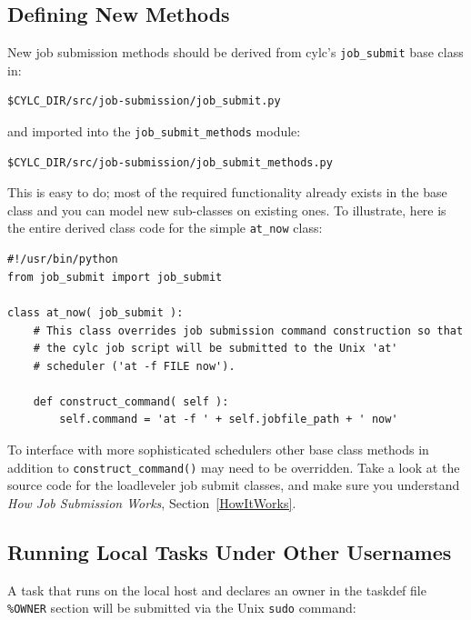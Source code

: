 \documentclass[11pt,a4paper]{article}
\begin{document}
\subsection{Defining New Methods}

New job submission methods should be derived from cylc's
\lstinline=job_submit= base class in:

\begin{lstlisting}
$CYLC_DIR/src/job-submission/job_submit.py
\end{lstlisting}

and imported into the \lstinline=job_submit_methods= module:

\begin{lstlisting}
$CYLC_DIR/src/job-submission/job_submit_methods.py
\end{lstlisting}

This is easy to do; most of the required functionality already exists in
the base class and you can model new sub-classes on existing ones. To
illustrate, here is the entire derived class code for the simple 
\lstinline=at_now= class:

\lstset{language=Python}

\begin{lstlisting}
#!/usr/bin/python
from job_submit import job_submit

class at_now( job_submit ):
    # This class overrides job submission command construction so that
    # the cylc job script will be submitted to the Unix 'at'
    # scheduler ('at -f FILE now').

    def construct_command( self ):
        self.command = 'at -f ' + self.jobfile_path + ' now'
\end{lstlisting}

To interface with more sophisticated schedulers other base class methods
in addition to \lstinline=construct_command()= may need to be overridden.
Take a look at the source code for the loadleveler job submit classes,
and make sure you understand {\em How Job Submission Works},
Section~\ref{HowItWorks}.

\subsection{Running Local Tasks Under Other Usernames}
\label{RunningLocalTasksUnderOtherUsernames}

\lstset{language=cylctaskdef}

A task that runs on the local host and declares an owner in the taskdef
file \lstinline=%OWNER= section will be submitted via the Unix
\lstinline=sudo= command:  
\end{document}
